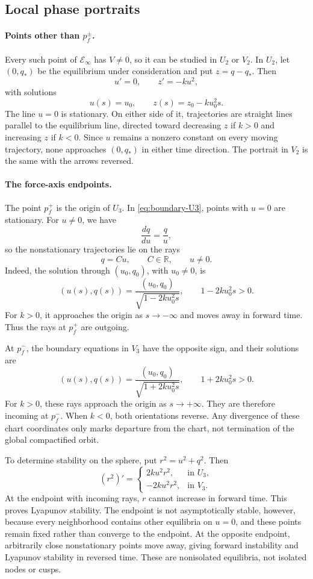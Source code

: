 \documentclass[11pt,reqno]{amsart}
\theoremstyle{plain}
\theoremstyle{definition}
\theoremstyle{remark}
\begin{document}
\subsection{Local phase portraits}
\label{subsec:infinity-local-portraits}

\paragraph{Points other than $p_f^\pm$.}
Every such point of $\mathcal E_\infty$ has $V\neq0$, so it
can be studied in $U_2$ or $V_2$. In $U_2$, let $(0,q_*)$
be the equilibrium under consideration and put $z=q-q_*$.
Then
\[
u'=0,\qquad z'=-ku^2,
\]
with solutions
\[
u(s)=u_0,\qquad z(s)=z_0-ku_0^2s.
\]
The line $u=0$ is stationary. On either side of it,
trajectories are straight lines parallel to the equilibrium
line, directed toward decreasing $z$ if $k>0$ and increasing
$z$ if $k<0$. Since $u$ remains a nonzero constant on every
moving trajectory, none approaches $(0,q_*)$ in either time
direction. The portrait in $V_2$ is the same with the arrows
reversed.

\paragraph{The force-axis endpoints.}
The point $p_f^+$ is the origin of $U_3$. In
\eqref{eq:boundary-U3}, points with $u=0$ are stationary.
For $u\neq0$, we have
\[
\frac{dq}{du}=\frac qu,
\]
so the nonstationary trajectories lie on the rays
\[
q=Cu,\qquad C\in\mathbb R,\qquad u\neq0.
\]
Indeed, the solution through $(u_0,q_0)$, with $u_0\neq0$, is
\[
(u(s),q(s))=
\frac{(u_0,q_0)}{\sqrt{1-2ku_0^2s}},
\qquad 1-2ku_0^2s>0.
\]
For $k>0$, it approaches the origin as $s\to-\infty$ and
moves away in forward time. Thus the rays at $p_f^+$ are
outgoing.

At $p_f^-$, the boundary equations in $V_3$ have the opposite
sign, and their solutions are
\[
(u(s),q(s))=
\frac{(u_0,q_0)}{\sqrt{1+2ku_0^2s}},
\qquad 1+2ku_0^2s>0.
\]
For $k>0$, these rays approach the origin as $s\to+\infty$.
They are therefore incoming at $p_f^-$. When $k<0$, both
orientations reverse. Any divergence of these chart coordinates
only marks departure from the chart, not termination of the
global compactified orbit.

To determine stability on the sphere, put $r^2=u^2+q^2$.
Then
\[
(r^2)'=
\begin{cases}
2ku^2r^2,&\text{in }U_3,\\
-2ku^2r^2,&\text{in }V_3.
\end{cases}
\]
At the endpoint with incoming rays, $r$ cannot increase in
forward time. This proves Lyapunov stability. The endpoint is
not asymptotically stable, however, because every neighborhood
contains other equilibria on $u=0$, and these points remain
fixed rather than converge to the endpoint. At the opposite
endpoint, arbitrarily close nonstationary points move away,
giving forward instability and Lyapunov stability in reversed
time. These are nonisolated equilibria, not isolated nodes
or cusps.
\end{document}
